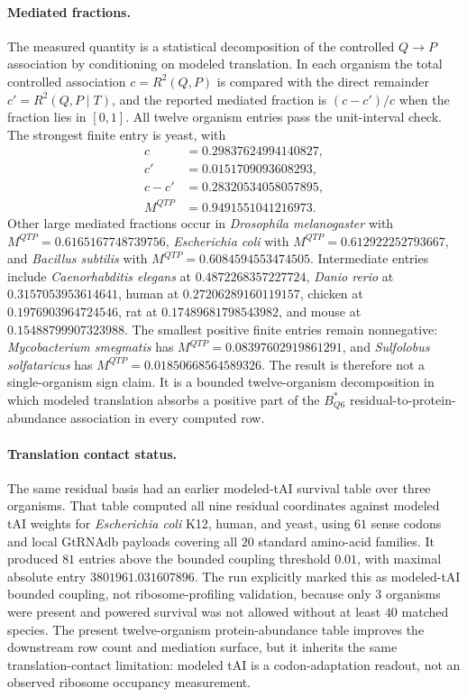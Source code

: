 \paragraph{Mediated fractions.}
The measured quantity is a statistical decomposition of the controlled $Q \to P$ association by conditioning on modeled translation.  In each organism the total controlled association $c=R^2(Q,P)$ is compared with the direct remainder $c'=R^2(Q,P\mid T)$, and the reported mediated fraction is $(c-c')/c$ when the fraction lies in $[0,1]$.  All twelve organism entries pass the unit-interval check.  The strongest finite entry is yeast, with
$$
\begin{aligned}
c &= 0.29837624994140827,\\
c' &= 0.0151709093608293,\\
c-c' &= 0.28320534058057895,\\
M^{QTP} &= 0.9491551041216973.
\end{aligned}
$$
Other large mediated fractions occur in \emph{Drosophila melanogaster} with $M^{QTP}=0.6165167748739756$, \emph{Escherichia coli} with $M^{QTP}=0.612922252793667$, and \emph{Bacillus subtilis} with $M^{QTP}=0.6084594553474505$.  Intermediate entries include \emph{Caenorhabditis elegans} at $0.4872268357227724$, \emph{Danio rerio} at $0.3157053953614641$, human at $0.27206289160119157$, chicken at $0.1976903964724546$, rat at $0.17489681798543982$, and mouse at $0.15488799907323988$.  The smallest positive finite entries remain nonnegative: \emph{Mycobacterium smegmatis} has $M^{QTP}=0.08397602919861291$, and \emph{Sulfolobus solfataricus} has $M^{QTP}=0.01850668564589326$.  The result is therefore not a single-organism sign claim.  It is a bounded twelve-organism decomposition in which modeled translation absorbs a positive part of the $B^{\ast}_{Q6}$ residual-to-protein-abundance association in every computed row.

\paragraph{Translation contact status.}
The same residual basis had an earlier modeled-tAI survival table over three organisms.  That table computed all nine residual coordinates against modeled tAI weights for \emph{Escherichia coli} K12, human, and yeast, using $61$ sense codons and local GtRNAdb payloads covering all $20$ standard amino-acid families.  It produced $81$ entries above the bounded coupling threshold $0.01$, with maximal absolute entry $3801961.031607896$.  The run explicitly marked this as modeled-tAI bounded coupling, not ribosome-profiling validation, because only $3$ organisms were present and powered survival was not allowed without at least $40$ matched species.  The present twelve-organism protein-abundance table improves the downstream row count and mediation surface, but it inherits the same translation-contact limitation: modeled tAI is a codon-adaptation readout, not an observed ribosome occupancy measurement.

